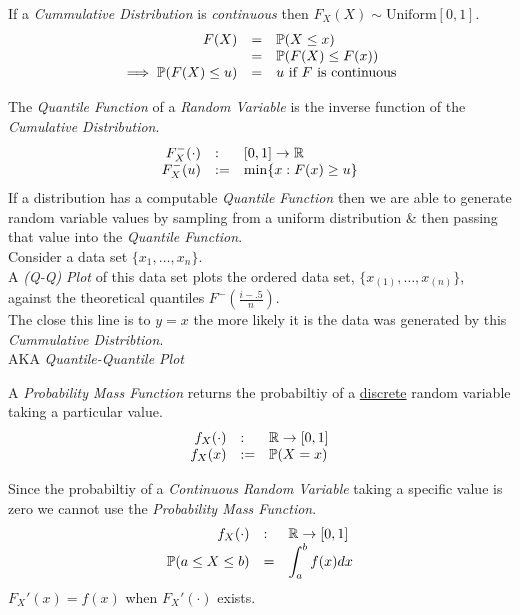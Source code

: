 \documentclass[11pt,a4paper]{article}
\begin{document}
If a \textit{Cummulative Distribution} is \textit{continuous} then $F_X(X)\sim\text{Uniform}[0,1]$.\\

\[\begin{array}{rcl}
F(X)&=&\mathbb{P}(X\leq x)\\
&=&\mathbb{P}(F(X)\leq F(x))\\
\implies\mathbb{P}(F(X)\leq u)&=&u\text{ if $F$ is continuous}
\end{array}\]

The \textit{Quantile Function} of a \textit{Random Variable} is the inverse function of the \textit{Cumulative Distribution}.\\
\[\begin{array}{rll}
F^-_X(\cdot)&:&[0,1]\to\mathbb{R}\\
F^-_X(u)&:=&\min\{x:F(x)\geq u\}
\end{array}\]
If a distribution has a computable \textit{Quantile Function} then we are able to generate random variable values by sampling from a uniform distribution \& then passing that value into the \textit{Quantile Function}.\\

Consider a data set $\{x_1,\dots,x_n\}$.\\
A \textit{(Q-Q) Plot} of this data set plots the ordered data set, $\{x_{(1)},\dots,x_{(n)}\}$, against the theoretical quantiles $F^-\left(\frac{i-.5}n\right)$.\\
The close this line is to $y=x$ the more likely it is the data was generated by this \textit{Cummulative Distribtion}.\\
\nb AKA \textit{Quantile-Quantile Plot}

A \textit{Probability Mass Function} returns the probabiltiy of a \underline{discrete} random variable taking a particular value.
\[\begin{array}{rll}
f_X(\cdot)&:&\mathbb{R}\to[0,1]\\
f_X(x)&:=&\mathbb{P}(X=x)\\
\end{array}\]

Since the probabiltiy of a \textit{Continuous Random Variable} taking a specific value is zero we cannot use the \textit{Probability Mass Function}.
\[\begin{array}{rll}
f_X(\cdot)&:&\mathbb{R}\to[0,1]\\
\mathbb{P}(a\leq X\leq b)&=&\displaystyle\int_a^bf(x)dx
\end{array}\]
\nb $F_X'(x)=f(x)$ when $F_X'(\cdot)$ exists.\\
\end{document}

